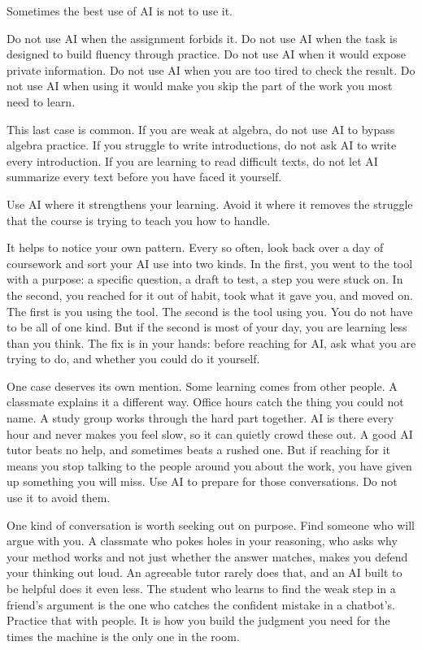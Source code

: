 \documentclass{SIAMbook2023}
\begin{document}
Sometimes the best use of AI is not to use it.

Do not use AI when the assignment forbids it. Do not use AI when the task is designed to build fluency through practice. Do not use AI when it would expose private information. Do not use AI when you are too tired to check the result. Do not use AI when using it would make you skip the part of the work you most need to learn.

This last case is common. If you are weak at algebra, do not use AI to bypass algebra practice. If you struggle to write introductions, do not ask AI to write every introduction. If you are learning to read difficult texts, do not let AI summarize every text before you have faced it yourself.

Use AI where it strengthens your learning. Avoid it where it removes the struggle that the course is trying to teach you how to handle.

It helps to notice your own pattern. Every so often, look back over a day of coursework and sort your AI use into two kinds. In the first, you went to the tool with a purpose: a specific question, a draft to test, a step you were stuck on. In the second, you reached for it out of habit, took what it gave you, and moved on. The first is you using the tool. The second is the tool using you. You do not have to be all of one kind. But if the second is most of your day, you are learning less than you think. The fix is in your hands: before reaching for AI, ask what you are trying to do, and whether you could do it yourself.

One case deserves its own mention. Some learning comes from other people. A classmate explains it a different way. Office hours catch the thing you could not name. A study group works through the hard part together. AI is there every hour and never makes you feel slow, so it can quietly crowd these out. A good AI tutor beats no help, and sometimes beats a rushed one. But if reaching for it means you stop talking to the people around you about the work, you have given up something you will miss. Use AI to prepare for those conversations. Do not use it to avoid them.

One kind of conversation is worth seeking out on purpose. Find someone who will argue with you. A classmate who pokes holes in your reasoning, who asks why your method works and not just whether the answer matches, makes you defend your thinking out loud. An agreeable tutor rarely does that, and an AI built to be helpful does it even less. The student who learns to find the weak step in a friend's argument is the one who catches the confident mistake in a chatbot's. Practice that with people. It is how you build the judgment you need for the times the machine is the only one in the room.
\end{document}
